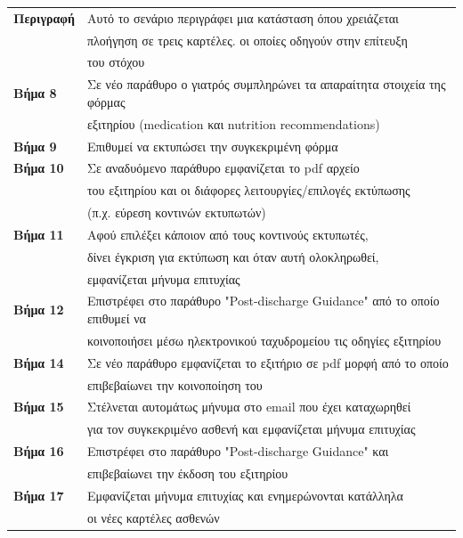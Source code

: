 \documentclass{article}
\newcommand\T{\rule{0pt}{2.6ex}}       %
\newcommand\B{\rule[-1.2ex]{0pt}{0pt}}
\begin{document}
 \vspace{0.2cm}
 \begin{center}
     \begin{tabular}{|l|l|}
     \hline
      \textbf{Περιγραφή} & Αυτό το σενάριο περιγράφει μια κατάσταση όπου χρειάζεται \T \\& πλοήγηση σε τρεις καρτέλες. οι οποίες οδηγούν στην επίτευξη \\& του στόχου \B \\ 
      \hline
      \textbf{Βήμα 8} & Σε νέο παράθυρο ο γιατρός συμπληρώνει τα απαραίτητα στοιχεία της φόρμας \T \\& εξιτηρίου (medication και nutrition recommendations) \\
      \hline
      \textbf{Βήμα 9} & Επιθυμεί να εκτυπώσει την συγκεκριμένη φόρμα \T\B \\
      \hline
      \textbf{Βήμα 10} & Σε αναδυόμενο παράθυρο εμφανίζεται το pdf αρχείο \T \\& του εξιτηρίου και οι διάφορες λειτουργίες/επιλογές εκτύπωσης \\& (π.χ. εύρεση κοντινών εκτυπωτών) \B \\
      \hline
      \textbf{Βήμα 11} & Αφού επιλέξει κάποιον από τους κοντινούς εκτυπωτές, \T \\& δίνει έγκριση για εκτύπωση και όταν αυτή ολοκληρωθεί, \\& εμφανίζεται μήνυμα επιτυχίας \B \\
      \hline
      \textbf{Βήμα 12} & Επιστρέφει στο παράθυρο "Post-discharge Guidance" από το οποίο επιθυμεί να \T \\& κοινοποιήσει μέσω ηλεκτρονικού ταχυδρομείου τις οδηγίες εξιτηρίου \B \\
      \hline
      \textbf{Βήμα 14} & Σε νέο παράθυρο εμφανίζεται το εξιτήριο σε pdf μορφή από το οποίο \T\\&επιβεβαίωνει την κοινοποίηση του \B \\
      \hline
      \textbf{Βήμα 15} & Στέλνεται αυτομάτως μήνυμα στο email που έχει καταχωρηθεί \T \\& για τον συγκεκριμένο ασθενή και εμφανίζεται μήνυμα επιτυχίας \B \\
      \hline
      \textbf{Βήμα 16} & Επιστρέφει στο παράθυρο "Post-discharge Guidance" και \T \\& επιβεβαίωνει την έκδοση του εξιτηρίου  \T\B \\   
      \hline
      \textbf{Βήμα 17} & Εμφανίζεται μήνυμα επιτυχίας και ενημερώνονται κατάλληλα \T \\& οι νέες καρτέλες ασθενών  \B \\      
      \hline
     \end{tabular}
 \end{center}
 
\end{document}
